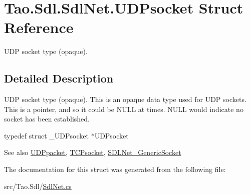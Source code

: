 \hypertarget{struct_tao_1_1_sdl_1_1_sdl_net_1_1_u_d_psocket}{
\section{Tao.Sdl.SdlNet.UDPsocket Struct Reference}
\label{struct_tao_1_1_sdl_1_1_sdl_net_1_1_u_d_psocket}
}


UDP socket type (opaque).  




\subsection{Detailed Description}
UDP socket type (opaque). This is an opaque data type used for UDP sockets. This is a pointer, and so it could be NULL at times. NULL would indicate no socket has been established. 
\begin{DoxyCode}
                    typedef struct _UDPsocket *UDPsocket
\end{DoxyCode}


\begin{DoxySeeAlso}{See also}
\hyperlink{struct_tao_1_1_sdl_1_1_sdl_net_1_1_u_d_ppacket}{UDPpacket}, \hyperlink{struct_tao_1_1_sdl_1_1_sdl_net_1_1_t_c_psocket}{TCPsocket}, \hyperlink{struct_tao_1_1_sdl_1_1_sdl_net_1_1_s_d_l_net___generic_socket}{SDLNet\_\-GenericSocket}


\end{DoxySeeAlso}


The documentation for this struct was generated from the following file:\begin{DoxyCompactItemize}
\item 
src/Tao.Sdl/\hyperlink{_sdl_net_8cs}{SdlNet.cs}\end{DoxyCompactItemize}
